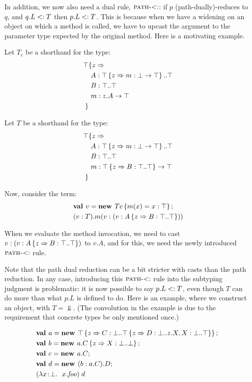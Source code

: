 \documentclass[preprint]{sigplanconf}
\begin{document}
In addition, we now also need a dual rule, $\textsc{path-$<:$}$: if
$p$ (path-dually)-reduces to $q$, and $q.L <: T$ then $p.L <:
T$. This is because when we have a widening on an object on which a
method is called, we have to upcast the argument to the parameter type
expected by the original method. Here is a motivating example.

Let $T_c$ be a shorthand for the type:
\begin{align*}
\top &\{z \Rightarrow \\
&\ A : \top \left\{z \Rightarrow m : \bot \rightarrow \top \right\}..\top\\
&\ B : \top..\top\\
&\ m : z.A \rightarrow \top\\
 \}&
\end{align*}

Let $T$ be a shorthand for the type:
\begin{align*}
\top &\{z \Rightarrow \\
&\ A : \top \left\{z \Rightarrow m : \bot \rightarrow \top \right\}..\top\\
&\ B : \top..\top\\
&\ m : \top \left\{z \Rightarrow B : \top..\top \right\} \rightarrow \top\\
 \}&
\end{align*}

Now, consider the term:
\begin{align*}
&\mlnew v {Tc \ldefs{m(x)=\wid x \Top}}{
(\wid v T).m(\wid v {(\wid v {A \refine z {\Ldecl B \Top \Top}})})
}
\end{align*}

When we evaluate the method invocation, we need to cast $v : (v : A \left\{z \Rightarrow B : \top..\top \right\})$ to $v.A$, and for this, we
need the newly introduced $\textsc{path-$<:$}$ rule.

Note that the path dual reduction can be a bit stricter with casts
than the path reduction. In any case, introducing this
$\textsc{path-$<:$}$ rule into the subtyping judgment is
problematic: it is now possible to say $p.L <: T$, even though $T$
can do more than what $p.L$ is defined to do. Here is an example,
where we construct an object, with $T = \Bot$. (The convolution in the
example is due to the requirement that concrete types be only
mentioned once.)

\begin{align*}
&\mlnew a {\Top \refine z {\Ldecl C \Bot {\Top \refine z {\Ldecl D \Bot {z.X}, \Ldecl X \Bot \Top}}}}{
\mlnew b {{a.C} \refine z {\Ldecl X \Bot \Bot}}}{
\mlnew c {a.C}}{
\mlnew d {(\wid b {a.C}).D}}{
\app {(\abs x \Bot {x.\mathit{foo}})} d
}
\end{align*}
\end{document}
